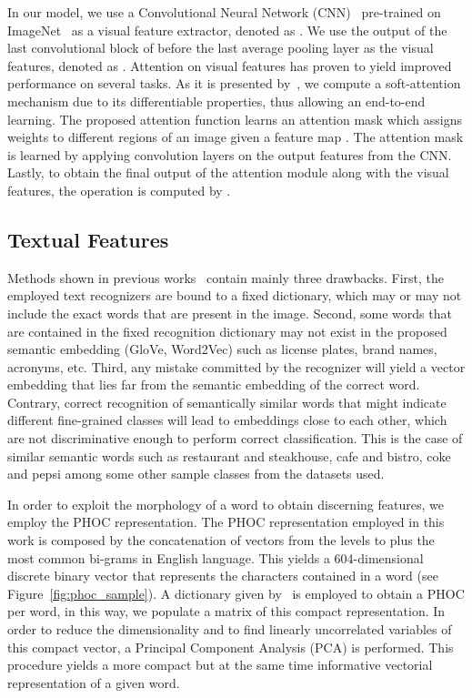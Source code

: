\documentclass[10pt,twocolumn,letterpaper]{article}
\begin{document}
In our model, we use a Convolutional Neural Network (CNN)~\cite{he2016deep} pre-trained on ImageNet~\cite{deng2009imagenet} as a visual feature extractor, denoted as . We use the output of the last convolutional block of  before the last average pooling layer as the visual features, denoted as .
Attention on visual features has proven to yield improved performance on several tasks. As it is presented by~\cite{dey2019doodle}, we compute a soft-attention mechanism due to its differentiable properties, thus allowing an end-to-end learning. The proposed attention function learns an attention mask  which assigns weights to different regions of an image given a feature map . The attention mask is learned by applying  convolution layers on the output features from the CNN. Lastly, to obtain the final output of the attention module along with the visual features, the operation is computed by . 

\subsection{Textual Features}
\label{sec:textual_features}
Methods shown in previous works~\cite{karaoglu2017words,bai2018integrating} contain mainly three drawbacks. First, the employed text recognizers are bound to a fixed dictionary, which may or may not include the exact words that are present in the image. Second, some words that are contained in the fixed recognition dictionary may not exist in the proposed semantic embedding (GloVe, Word2Vec) such as license plates, brand names, acronyms, etc. 
Third, any mistake committed by the recognizer will yield a vector embedding that lies far from the semantic embedding of the correct word. Contrary, 
correct recognition of semantically similar words that might indicate different fine-grained classes will lead to embeddings close to each other, which are not discriminative enough to perform correct classification. This is the case of similar semantic words such as restaurant and steakhouse, cafe and bistro, coke and pepsi among some other sample classes from the datasets used.

In order to exploit the morphology of a word to obtain discerning features, we employ the PHOC representation. The PHOC representation employed in this work is composed by the concatenation of vectors from the levels  to  plus the  most common bi-grams in English language. This yields a 604-dimensional discrete binary vector that represents the characters contained in a word (see Figure~\ref{fig:phoc_sample}). A dictionary given by~\cite{jaderberg2016reading} is employed to obtain a PHOC per word, in this way, we populate a matrix of this compact representation. In order to reduce the dimensionality and to find linearly uncorrelated variables of this compact vector, a Principal Component Analysis (PCA) is performed. This procedure yields a more compact but at the same time informative vectorial representation of a given word. 
\end{document}
